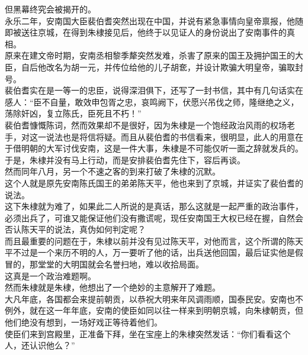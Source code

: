 \begin{multicols}{\theparacolNo}
但黑幕终究会被揭开的。\\

永乐二年，安南国大臣裴伯耆突然出现在中国，并说有紧急事情向皇帝禀报，他随即被送往京城，在得到朱棣接见后，他终于以见证人的身份说出了安南事件的真相。\\

原来在建文帝时期，安南丞相黎季犛突然发难，杀害了原来的国王及拥护国王的大臣，自后他改名为胡一元，并传位给他的儿子胡奃，并设计欺骗大明皇帝，骗取封号。\\

裴伯耆实在是一等一的忠臣，说得深泪俱下，还写了一封书信，其中有几句话实在感人：“臣不自量，敢效申包胥之忠，哀鸣阙下，伏愿兴吊伐之师，隆继绝之义，荡除奸凶，复立陈氏，臣死且不朽！”\\

裴伯耆慷慨陈词，然而效果却不是很好，因为朱棣是一个饱经政治风雨的权场老手，对这一说法也是将信将疑。而且从裴伯耆的书信看来，很明显，此人的用意在于借明朝的大军讨伐安南，这是一件大事，朱棣是不可能仅听一面之辞就发兵的。于是，朱棣并没有马上行动，而是安排裴伯耆先住下，容后再谈。\\

然而同年八月，另一个不速之客的到来打破了朱棣的沉默。\\

这个人就是原先安南陈氏国王的弟弟陈天平，他也来到了京城，并证实了裴伯耆的说法。\\

这下朱棣就为难了，如果此二人所说的是真话，那么这就是一起严重的政治事件，必须出兵了，可谁又能保证他们没有撒谎呢，现任安南国王大权已经在握，自然会否认陈天平的说法，真伪如何判定呢？\\

而且最重要的问题在于，朱棣以前并没有见过陈天平，对他而言，这个所谓的陈天平不过是一个来历不明的人，万一要听了他的话，出兵送他回国，最后证实他是假冒的，那堂堂的大明国就会名誉扫地，难以收拾局面。\\

这真是一个政治难题啊。\\

然而朱棣就是朱棣，他想出了一个绝妙的主意解开了难题。\\

大凡年底，各国都会来提前朝贡，以恭祝大明来年风调雨顺，国泰民安。安南也不例外，就在这一年年底，安南的使臣如同以往一样来到明朝京城，向朱棣朝贡，但他们绝没有想到，一场好戏正等待着他们。\\

使臣们来到宫殿里，正准备下拜，坐在宝座上的朱棣突然发话：“你们看看这个人，还认识他么？”\\


\end{multicols}
